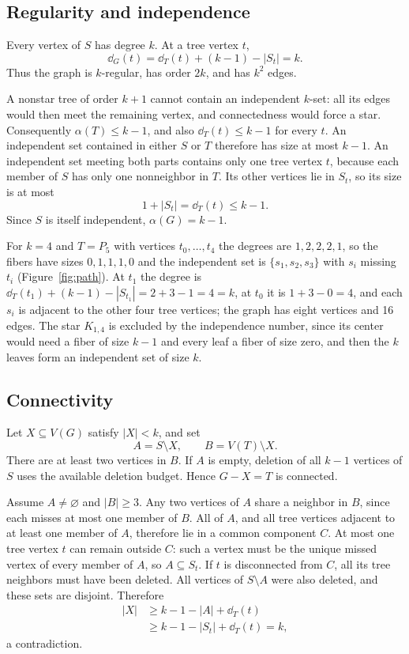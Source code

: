 \subsection{Regularity and independence}

Every vertex of $S$ has degree $k$. At a tree vertex $t$,
\begin{equation}
\dd_G(t)=\dd_T(t)+(k-1)-|S_t|=k.
\end{equation}
Thus the graph is $k$-regular, has order $2k$, and has $k^2$ edges.

A nonstar tree of order $k+1$ cannot contain an independent $k$-set: all its edges would then meet the remaining vertex, and connectedness would force a star.
Consequently $\alpha(T)\le k-1$, and also $\dd_T(t)\le k-1$ for every $t$.
An independent set contained in either $S$ or $T$ therefore has size at most $k-1$.
An independent set meeting both parts contains only one tree vertex $t$, because each member of $S$ has only one nonneighbor in $T$.
Its other vertices lie in $S_t$, so its size is at most
\begin{equation}
1+|S_t|=\dd_T(t)\le k-1.
\end{equation}
Since $S$ is itself independent, $\alpha(G)=k-1$.

For $k=4$ and $T=P_5$ with vertices $t_0,\ldots,t_4$ the degrees are $1,2,2,2,1$, so the fibers have sizes $0,1,1,1,0$ and the independent set is $\{s_1,s_2,s_3\}$ with $s_i$ missing $t_i$ (Figure~\ref{fig:path}).
At $t_1$ the degree is $\dd_T(t_1)+(k-1)-|S_{t_1}|=2+3-1=4=k$, at $t_0$ it is $1+3-0=4$, and each $s_i$ is adjacent to the other four tree vertices; the graph has eight vertices and 16 edges.
The star $K_{1,4}$ is excluded by the independence number, since its center would need a fiber of size $k-1$ and every leaf a fiber of size zero, and then the $k$ leaves form an independent set of size $k$.

\subsection{Connectivity}

Let $X\subseteq V(G)$ satisfy $|X|<k$, and set
\begin{equation}
A=S\setminus X,\qquad B=V(T)\setminus X.
\end{equation}
There are at least two vertices in $B$.
If $A$ is empty, deletion of all $k-1$ vertices of $S$ uses the available deletion budget. Hence $G-X=T$ is connected.

Assume $A\ne\varnothing$ and $|B|\ge3$.
Any two vertices of $A$ share a neighbor in $B$, since each misses at most one member of $B$.
All of $A$, and all tree vertices adjacent to at least one member of $A$, therefore lie in a common component $C$.
At most one tree vertex $t$ can remain outside $C$: such a vertex must be the unique missed vertex of every member of $A$, so $A\subseteq S_t$.
If $t$ is disconnected from $C$, all its tree neighbors must have been deleted.
All vertices of $S\setminus A$ were also deleted, and these sets are disjoint. Therefore
\begin{align*}
|X|&\ge k-1-|A|+\dd_T(t)\\
&\ge k-1-|S_t|+\dd_T(t)=k,
\end{align*}
a contradiction.

